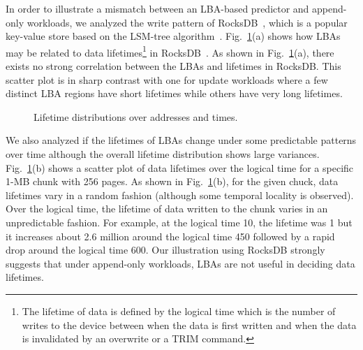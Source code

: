 In order to illustrate a mismatch between an LBA-based predictor and 
append-only workloads, we analyzed the write pattern of 
RocksDB~\cite{RocksDB}, which is a
popular key-value store based on the LSM-tree algorithm~\cite{LSM}.
Fig.~\ref{fig:lba_lifetime}(a) shows how LBAs may be related 
to data lifetimes\footnote{The lifetime of data is defined 
by the logical time which is the number of writes to the device 
between when the data is first written 
and when the data is invalidated by an overwrite or a TRIM command.}
in RocksDB~\cite{RocksDB}.  
As shown in Fig.~\ref{fig:lba_lifetime}(a), 
there exists no strong correlation between the LBAs and lifetimes in RocksDB.  
This scatter plot is in sharp contrast with one for update workloads 
where a few distinct LBA regions have short lifetimes while others 
have very long lifetimes.

\begin{figure}[t]
	\centering
	\hfill
	\hspace{10pt}
	\caption{Lifetime distributions over addresses and times.} %
	\label{fig:lba_lifetime}
\end{figure}


We also analyzed 
if the lifetimes of LBAs change under some predictable patterns over time 
although the overall lifetime distribution shows large variances.
Fig.~\ref{fig:lba_lifetime}(b) shows a scatter plot of data lifetimes over the logical time 
for a specific 1-MB chunk with 256 pages. 
As shown in Fig.~\ref{fig:lba_lifetime}(b), 
for the given chuck, data lifetimes vary in a random fashion
(although some temporal locality is observed).
Over the logical time, the lifetime of data written to the chunk 
varies in an unpredictable fashion.  
For example, at the logical time 10, the lifetime was 1 but it increases about 
2.6 million around the logical time 450 
followed by a rapid drop around the logical time 600. 
Our illustration using RocksDB strongly suggests that under append-only
workloads, LBAs are not useful in deciding data lifetimes.


